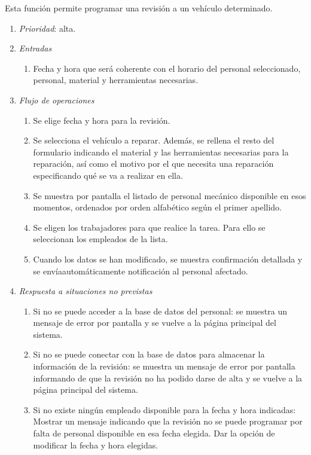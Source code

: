 
	Esta función permite programar una revisión a un vehículo determinado.

\begin{enumerate}
	\item \textit{Prioridad}: alta.
	\item \textit{Entradas}
	\begin{enumerate}
		\item Fecha y hora que será coherente con el horario del personal seleccionado, personal, material y herramientas necesarias.
	\end{enumerate}
	\item \textit{Flujo de operaciones}
	\begin{enumerate}
		\item Se elige fecha y hora para la revisión. 
		\item Se selecciona el vehículo a reparar. Además, se rellena el resto del formulario indicando el material y las herramientas necesarias para la reparación, así como el motivo por el que necesita una reparación especificando qué se va a realizar en ella.
		\item Se muestra por pantalla el listado de personal mecánico disponible en esos momentos, ordenados por orden alfabético según el primer apellido. 
		\item Se eligen los trabajadores para que realice la tarea. Para ello se seleccionan los empleados de la lista.
		\item Cuando los datos se han modificado, se muestra confirmación detallada y se envía\break automáticamente notificación al personal afectado.
	\end{enumerate}
	\item \textit{Respuesta a situaciones no previstas}
	\begin{enumerate}
		\item Si no se puede acceder a la base de datos del personal: se muestra un mensaje de error por pantalla y se vuelve a la página principal del sistema.
		\item Si no se puede conectar con la base de datos para almacenar la información de la revisión: se muestra un mensaje de error por pantalla informando de que la revisión no ha podido darse de alta y se vuelve a la página principal del sistema.
		\item Si no existe ningún empleado disponible para la fecha y hora indicadas: Mostrar un mensaje indicando que la revisión no se puede programar por falta de personal disponible en esa fecha elegida. Dar la opción de modificar la fecha y hora elegidas.
	\end{enumerate}

\end{enumerate}

